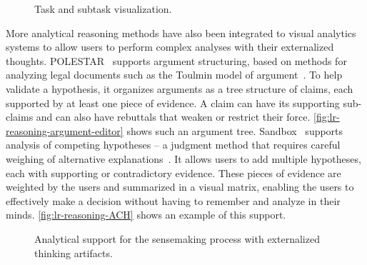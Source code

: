 \begin{figure}
\centering
{}
\hfill
{}
\caption{Task and subtask visualization.}
\end{figure}

More analytical reasoning methods have also been integrated to visual analytics systems to allow users to perform complex analyses with their externalized thoughts. POLESTAR~\cite{Pioch2006} supports argument structuring, based on methods for analyzing legal documents such as the Toulmin model of argument~\cite{Toulmin2003}. To help validate a hypothesis, it organizes arguments as a tree structure of claims, each supported by at least one piece of evidence. A claim can have its supporting sub-claims and can also have rebuttals that weaken or restrict their force. \autoref{fig:lr-reasoning-argument-editor} shows such an argument tree. Sandbox~\cite{Wright2006} supports analysis of competing hypotheses -- a judgment method that requires careful weighing of alternative explanations~\cite{Heuer1999}. It allows users to add multiple hypotheses, each with supporting or contradictory evidence. These pieces of evidence are weighted by the users and summarized in a visual matrix, enabling the users to effectively make a decision without having to remember and analyze in their minds. \autoref{fig:lr-reasoning-ACH} shows an example of this support.

\begin{figure}
\centering
{}
\hfill
{}
\caption[Analytical support for the sensemaking process]{Analytical support for the sensemaking process with externalized thinking artifacts.}
\label{fig:lr-reasoning}
\end{figure}

